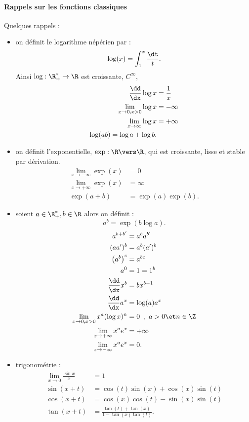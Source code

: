 \documentclass{mybourbaki}
\begin{document}
\paragraph{Rappels sur les fonctions classiques}Quelques rappels :
\begin{itemize}
\item on définit le logarithme népérien par : \[ \log(x) = \int_{1}^{x}\frac{\dt}{t}.\]Ainsi $\log : \R^{*}_{+} \to \R$ est croissante, $C^{\infty}$, 
\begin{align*}
\frac{\dd}{\dx}\log x &= \frac{1}{x}\\
\lim_{x\to 0, x>0} \log x &= -\infty \\
\lim_{x\to \infty} \log x &= +\infty \\
\log(ab) = \log a + \log b.
\end{align*}
\item on définit l'exponentielle, $\exp : \R \vers \R$, qui est croissante, lisse et stable par dérivation.
\begin{align*}
\lim_{x\to -\infty}\exp(x) &= 0 \\
\lim_{x\to + \infty} \exp(x) &= \infty\\
\exp(a+b) &= \exp(a)\exp(b).
\end{align*}
\item soient $a\in \R_+^{*}, b\in \R$ alors on définit : \[ a^{b} = \exp(b\log a).\]
\begin{align*}
a^{b+b'} &= a^{b}a^{b'} \\
(aa')^{b} &= a^{b} (a')^{b} \\
\left(a^{b}\right)^{c} &= a^{bc}\\
a^{0} &= 1 = 1^{b}\\
\frac{\dd }{\dx}x^{b} &= bx^{b-1} \\
\frac{\dd }{\dx}a^{x} &= \log (a)a^{x} \\
\lim_{x\to 0, x >0} x^{a}(\log x)^{n} &= 0\; \; ,\; a >0 \et n\in \Z \\
\lim_{x\to+\infty} x^{a} e^{x} &= +\infty \\
\lim_{x\to -\infty} x^{a}e^{x} &= 0.
\end{align*}
\item trigonométrie :
\begin{align*}
\lim_{x\to 0}\frac{\sin x}{x} &= 1 \\
\sin(x+t) &= \cos(t)\sin(x) + \cos(x)\sin(t) \\
\cos(x+t) &= \cos(x)\cos(t) - \sin(x)\sin(t)\\
\tan(x+t) &= \frac{\tan(t) + \tan(x)}{1 - \tan(x)\tan(t)}.

\end{align*}
\end{itemize}
\end{document}
